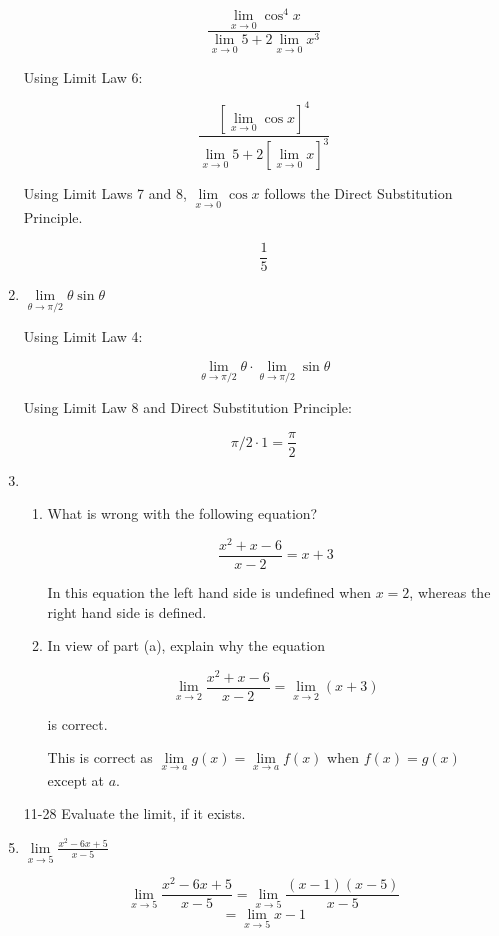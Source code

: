 \documentclass{article}
\begin{document}
\begin{enumerate}
			$$\frac{\lim\limits _{x \to 0} \cos ^4 x}{\lim \limits _{x \to 0} 5 + 2 \lim \limits _{x \to 0} x^3}$$
			
			Using Limit Law 6:
			
			$$\frac{[\lim \limits _{x \to 0} \cos x]^4}{\lim \limits _{x \to 0} 5 + 2 [\lim \limits _{x \to 0} x]^3}$$
			
			Using Limit Laws 7 and 8, $\lim \limits _{x \to 0} \cos x$ follows the Direct Substitution Principle.
			
			$$\frac{1}{5}$$
			
		\item $\lim \limits _{\theta \to \pi / 2} \theta \sin \theta$
		
			Using Limit Law 4:
			
			$$\lim \limits _{\theta \to \pi / 2} \theta \cdot \lim \limits _{\theta \to \pi / 2} \sin \theta$$
			
			Using Limit Law 8 and Direct Substitution Principle:
			
			$$\pi /2 \cdot 1= \frac{\pi}{2}$$
		
		\item{}

		\begin{enumerate}
			\item What is wrong with the following equation?

			$$\frac{x^2 + x - 6}{x-2} = x + 3$$

			In this equation the left hand side is undefined when $x=2$, whereas
			the right hand side is defined.

			\item In view of part (a), explain why the equation

			$$\lim \limits _{x \to 2} \frac{x^2 + x - 6}{x-2} = \lim \limits _{x \to 2} (x+3)$$

			is correct.

			This is correct as $\lim \limits _{x \to a} g(x) = \lim \limits _{x \to a} f(x)$ when $f(x) = g(x)$
			except at $a$.
		\end{enumerate}

		\item[11-28] Evaluate the limit, if it exists.

		\item $\lim \limits _{x \to 5} \frac{x^2-6x+5}{x-5}$

		$$\lim \limits _{x \to 5} \frac{x^2-6x+5}{x-5} = \lim \limits _{x \to 5} \frac{(x-1)(x-5)}{x-5}$$
		$$ = \lim \limits _{x \to 5} x-1$$


\end{enumerate}
\end{document}
